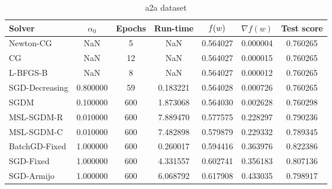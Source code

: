 \begin{table}
\caption{a2a dataset}
\label{tab:a2a-tab}
\centering
\begin{tabular}{lS[round-precision=3]S[drop-zero-decimal]S[round-precision=4]S[round-precision=6]S[exponent-mode=scientific]S[round-precision=6]}
\toprule
Solver & {$\alpha_0$} & {Epochs} & {Run-time} & {$\operatorname*{\mathit{f}}(w)$} & {$\nabla f(w)$} & {Test score} \\
\midrule
Newton-CG & NaN & 5 & NaN & 0.564027 & 0.000004 & 0.760265 \\
CG & NaN & 12 & NaN & 0.564027 & 0.000015 & 0.760265 \\
L-BFGS-B & NaN & 8 & NaN & 0.564027 & 0.000012 & 0.760265 \\
SGD-Decreasing & 0.800000 & 59 & 0.183221 & 0.564028 & 0.000726 & 0.760265 \\
SGDM & 0.100000 & 600 & 1.873068 & 0.564030 & 0.002628 & 0.760298 \\
MSL-SGDM-R & 0.010000 & 600 & 7.889470 & 0.577575 & 0.228297 & 0.790236 \\
MSL-SGDM-C & 0.010000 & 600 & 7.482898 & 0.579879 & 0.229332 & 0.789345 \\
BatchGD-Fixed & 1.000000 & 600 & 0.260017 & 0.594416 & 0.363976 & 0.822386 \\
SGD-Fixed & 1.000000 & 600 & 4.331557 & 0.602741 & 0.356183 & 0.807136 \\
SGD-Armijo & 1.000000 & 600 & 6.068792 & 0.617908 & 0.433035 & 0.798917 \\
\bottomrule
\end{tabular}
\end{table}

